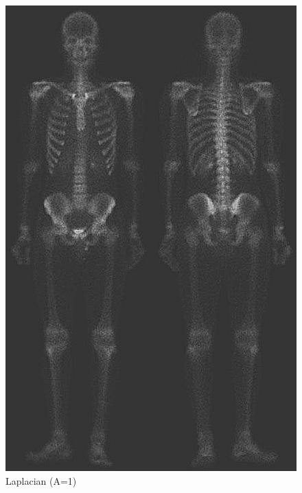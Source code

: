     \begin{figure}[!htb]\centering
        \includegraphics[width=0.4\linewidth]{./images/2/laplacian_A1.jpg}
        \caption{Laplacian (A=1)}\label{diagram:laplacian_1}
    \end{figure}

